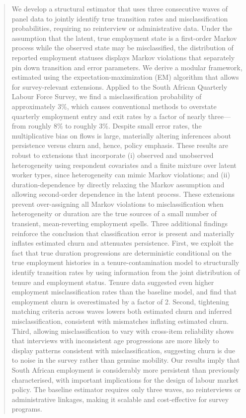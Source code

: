 \documentclass[letterpaper,12pt,final]{article}
\begin{document}
\begin{abstract}
We develop a structural estimator that uses three
consecutive waves of panel data to jointly identify true transition rates and
misclassification probabilities, requiring no reinterview or administrative
data. Under the assumption that the latent, true employment state is a first-order Markov 
process while the observed state may be misclassified, the distribution of reported 
employment statuses displays Markov violations that separately pin down transition 
and error parameters. We derive a modular framework, estimated using the expectation-maximization 
(EM) algorithm that allows for survey-relevant extensions. 
Applied to the South African Quarterly Labour Force Survey, we find a
misclassification probability of approximately 3\%, which causes conventional
methods to overstate quarterly employment entry and exit rates by a factor of
nearly three---from roughly 8\% to roughly 3\%. 
Despite small error rates, the multiplicative bias on flows is large, materially altering inferences 
about persistence versus churn and, hence, policy emphasis. These results are robust 
to extensions that incorporate (i) observed and unobserved heterogeneity 
using respondent covariates and 
a finite mixture over latent worker types, since heterogeneity can mimic Markov violations; 
and (ii) duration-dependence by directly relaxing the Markov assumption and allowing second-order 
dependence in the latent process. These extensions prevent over-assigning all Markov violations 
to misclassification when heterogeneity or duration are the true sources of a small number of 
transient, mean-reverting employment spells. Three additional findings reinforce the conclusion 
that classification error is present and
materially inflates estimated churn and attenuates persistence. First, we exploit the fact 
that true duration progressions are deterministic conditional on the true 
employment histories in a tenure-contamination model to structurally identify transition rates by using
information from the joint distribution of tenure and employment status. Tenure data suggested even higher
employment misclassification rates than the baseline model, and find that employment churn is 
overestimated by a factor of 2.  Second, tightening matching criteria across waves lowers both 
estimated churn and inferred misclassification, consistent with mismatches inflating estimated churn. 
Third, allowing misclassification to vary with cross-item reliability shows that interviews with 
inconsistent age progressions are more likely to display patterns consistent with misclassification, 
suggesting churn is due to noise in the survey rather than genuine mobility. 
Our results imply that South African employment is considerably more persistent than previously
characterised, with important implications for the design of labour market
policy. The baseline estimator requires only three 
waves, no reinterviews or administrative linkages, making it scalable and cost-effective 
for survey programs.




\end{abstract}
\end{document}
